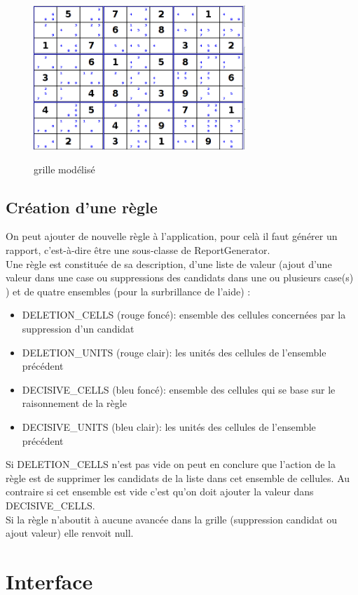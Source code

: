 \begin{figure}[ht]
  \caption{\label{annexe1} grille modélisé}
  \includegraphics [width=80mm]{images/fichier_type.png} \\[0.5cm]
\end{figure}
\newpage
\subsection{Création d’une règle}
On peut ajouter de nouvelle règle à l’application, pour celà il faut générer un rapport, 
c’est-à-dire être une sous-classe de ReportGenerator.\\
Une règle est constituée de sa description, d’une liste de valeur (ajout d’une valeur dans 
une case ou suppressions des candidats dans une ou plusieurs case(s) ) et de quatre ensembles 
(pour la surbrillance de l’aide) : 
\begin{itemize}
\item DELETION\_CELLS (rouge foncé): ensemble des cellules concernées par la suppression d’un candidat
\item DELETION\_UNITS (rouge clair): les unités des cellules de l'ensemble précédent
\item DECISIVE\_CELLS (bleu foncé): ensemble des cellules qui se base sur le raisonnement de la règle
\item DECISIVE\_UNITS (bleu clair): les unités des cellules de l'ensemble précédent
\end{itemize}
Si DELETION\_CELLS n’est pas vide on peut en conclure que l’action de la règle est de supprimer 
les candidats de la liste dans cet ensemble de cellules. Au contraire si cet ensemble est vide 
c’est qu’on doit ajouter la valeur  dans DECISIVE\_CELLS.\\
Si la règle n’aboutit à aucune avancée dans la grille (suppression candidat ou ajout valeur) 
elle renvoit null.


\newpage
\section{Interface}

